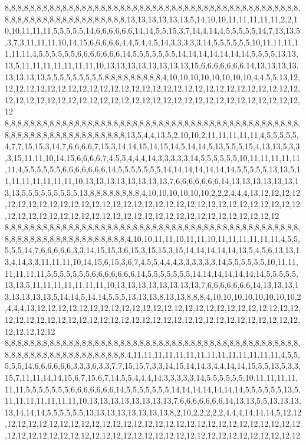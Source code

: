 8,8,8,8,8,8,8,8,8,8,8,8,8,8,8,8,8,8,8,8,8,8,8,8,8,8,8,8,8,8,8,8,8,8,8,8,8,8,8,8,8,8,8,8,8,8,8,8,8,8,8,8,8,8,8,8,8,8,8,8,8,8,8,8,8,13,13,13,13,13,13,5,14,10,10,11,11,11,11,11,2,2,10,10,11,11,11,5,5,5,5,5,14,6,6,6,6,6,6,14,14,5,5,15,3,7,14,4,14,4,5,5,5,5,5,14,7,13,13,5,3,7,3,11,11,11,10,14,15,6,6,6,6,6,4,4,5,4,4,5,14,3,3,3,3,3,14,5,5,5,5,5,5,10,11,11,11,11,11,11,4,5,5,5,5,5,5,6,6,6,6,6,6,6,14,5,5,5,5,5,5,5,14,14,14,14,14,14,14,5,5,5,5,13,13,13,5,11,11,11,11,11,11,11,10,13,13,13,13,13,13,13,13,15,6,6,6,6,6,6,6,14,13,13,13,13,13,13,13,13,5,5,5,5,5,5,5,5,5,8,8,8,8,8,8,8,8,8,4,10,10,10,10,10,10,10,10,4,4,5,5,13,12,12,12,12,12,12,12,12,12,12,12,12,12,12,12,12,12,12,12,12,12,12,12,12,12,12,12,12,12,12,12,12,12,12,12,12,12,12,12,12,12,12,12,12,12,12,12,12,12,12,12,12,12,12,12,12,12,12
8,8,8,8,8,8,8,8,8,8,8,8,8,8,8,8,8,8,8,8,8,8,8,8,8,8,8,8,8,8,8,8,8,8,8,8,8,8,8,8,8,8,8,8,8,8,8,8,8,8,8,8,8,8,8,8,8,8,8,8,8,8,8,8,8,13,5,4,4,13,5,2,10,10,2,11,11,11,11,11,4,5,5,5,5,5,4,7,7,15,15,3,14,7,6,6,6,6,7,15,3,14,14,15,14,15,14,5,14,14,5,13,5,5,5,15,4,13,13,5,3,3,3,15,11,11,10,14,15,6,6,6,6,7,4,5,5,4,4,4,14,3,3,3,3,3,14,5,5,5,5,5,5,10,11,11,11,11,11,11,4,5,5,5,5,5,5,6,6,6,6,6,6,6,14,5,5,5,5,5,5,5,14,14,14,14,14,14,14,5,5,5,5,5,13,13,5,11,11,11,11,11,11,11,10,13,13,13,13,13,13,13,13,7,6,6,6,6,6,6,6,14,13,13,13,13,13,13,13,13,5,5,5,5,5,5,5,5,5,13,8,8,8,8,8,8,8,8,4,10,10,10,10,10,10,2,2,2,4,4,4,13,12,12,12,12,12,12,12,12,12,12,12,12,12,12,12,12,12,12,12,12,12,12,12,12,12,12,12,12,12,12,12,12,12,12,12,12,12,12,12,12,12,12,12,12,12,12,12,12,12,12,12,12,12,12,12,12,12,12
8,8,8,8,8,8,8,8,8,8,8,8,8,8,8,8,8,8,8,8,8,8,8,8,8,8,8,8,8,8,8,8,8,8,8,8,8,8,8,8,8,8,8,8,8,8,8,8,8,8,8,8,8,8,8,8,8,8,8,8,8,8,8,8,8,4,10,10,11,11,10,11,11,10,11,11,11,11,11,11,4,5,5,5,5,5,14,7,6,6,6,6,6,3,3,14,15,15,3,6,15,3,15,15,3,15,14,14,14,14,14,13,5,4,5,6,13,13,13,4,14,3,3,11,11,11,10,14,15,6,15,3,6,7,4,5,5,4,4,4,3,3,3,3,3,3,14,5,5,5,5,5,5,10,11,11,11,11,11,11,5,5,5,5,5,5,5,6,6,6,6,6,6,6,14,5,5,5,5,5,5,5,14,14,14,14,14,14,14,5,5,5,5,5,13,13,5,11,11,11,11,11,11,11,10,13,13,13,13,13,13,13,13,7,6,6,6,6,6,6,6,14,13,13,13,13,13,13,13,13,5,14,14,5,14,14,5,5,5,13,13,13,8,13,13,8,8,8,4,10,10,10,10,10,10,10,10,2,4,4,4,13,12,12,12,12,12,12,12,12,12,12,12,12,12,12,12,12,12,12,12,12,12,12,12,12,12,12,12,12,12,12,12,12,12,12,12,12,12,12,12,12,12,12,12,12,12,12,12,12,12,12,12,12,12,12,12,12,12,12
8,8,8,8,8,8,8,8,8,8,8,8,8,8,8,8,8,8,8,8,8,8,8,8,8,8,8,8,8,8,8,8,8,8,8,8,8,8,8,8,8,8,8,8,8,8,8,8,8,8,8,8,8,8,8,8,8,8,8,8,8,8,8,8,8,4,11,11,11,11,11,11,11,11,11,11,11,11,11,11,4,5,5,5,5,5,14,6,6,6,6,6,6,3,3,3,6,3,3,7,7,15,15,7,3,3,14,15,14,14,3,4,4,14,14,15,5,5,13,5,3,3,15,7,11,11,14,14,15,6,7,15,6,7,14,5,5,4,4,4,14,3,3,3,3,3,14,5,5,5,5,5,5,10,11,11,11,11,11,11,5,5,5,5,5,5,5,6,6,6,6,6,6,6,14,5,5,5,5,5,5,5,14,14,14,14,14,14,14,5,5,5,5,5,5,13,5,11,11,11,11,11,11,11,10,13,13,13,13,13,13,13,13,7,6,6,6,6,6,6,6,14,13,13,5,5,13,13,13,13,14,14,14,5,5,5,5,5,5,13,13,13,13,13,13,13,13,8,2,10,2,2,2,2,2,4,4,4,14,14,14,5,12,12,12,12,12,12,12,12,12,12,12,12,12,12,12,12,12,12,12,12,12,12,12,12,12,12,12,12,12,12,12,12,12,12,12,12,12,12,12,12,12,12,12,12,12,12,12,12,12,12,12,12,12,12,12,12,12,12
